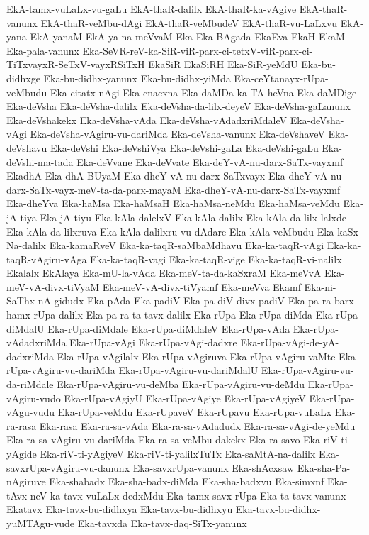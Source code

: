 {EkA-tamx-vuLaLx-vu-gaLu
EkA-thaR-dalilx
EkA-thaR-ka-vAgive
EkA-thaR-vanunx
EkA-thaR-veMbu-dAgi
EkA-thaR-veMbudeV
EkA-thaR-vu-LaLxvu
EkA-yana
EkA-yanaM
EkA-ya-na-meVvaM
Eka
Eka-BAgada
EkaEva
EkaH
EkaM
Eka-pala-vanunx
Eka-SeVR-reV-ka-SiR-viR-parx-ci-tetxV-viR-parx-ci-TiTxvayxR-SeTxV-vayxRSiTxH
EkaSiR
EkaSiRH
Eka-SiR-yeMdU
Eka-bu-didhxge
Eka-bu-didhx-yanunx
Eka-bu-didhx-yiMda
Eka-ceYtanayx-rUpa-veMbudu
Eka-citatx-nAgi
Eka-cnacxna
Eka-daMDa-ka-TA-heVna
Eka-daMDige
Eka-deVsha
Eka-deVsha-dalilx
Eka-deVsha-da-lilx-deyeV
Eka-deVsha-gaLanunx
Eka-deVshakekx
Eka-deVsha-vAda
Eka-deVsha-vAdadxriMdaleV
Eka-deVsha-vAgi
Eka-deVsha-vAgiru-vu-dariMda
Eka-deVsha-vanunx
Eka-deVshaveV
Eka-deVshavu
Eka-deVshi
Eka-deVshiVya
Eka-deVshi-gaLa
Eka-deVshi-gaLu
Eka-deVshi-ma-tada
Eka-deVvane
Eka-deVvate
Eka-deY-vA-nu-darx-SaTx-vayxmf
EkadhA
Eka-dhA-BUyaM
Eka-dheY-vA-nu-darx-SaTxvayx
Eka-dheY-vA-nu-darx-SaTx-vayx-meV-ta-da-parx-mayaM
Eka-dheY-vA-nu-darx-SaTx-vayxmf
Eka-dheYva
Eka-haMsa
Eka-haMsaH
Eka-haMsa-neMdu
Eka-haMsa-veMdu
Eka-jA-tiya
Eka-jA-tiyu
Eka-kAla-dalelxV
Eka-kAla-dalilx
Eka-kAla-da-lilx-lalxde
Eka-kAla-da-lilxruva
Eka-kAla-dalilxru-vu-dAdare
Eka-kAla-veMbudu
Eka-kaSx-Na-dalilx
Eka-kamaRveV
Eka-ka-taqR-saMbaMdhavu
Eka-ka-taqR-vAgi
Eka-ka-taqR-vAgiru-vAga
Eka-ka-taqR-vagi
Eka-ka-taqR-vige
Eka-ka-taqR-vi-nalilx
Ekalalx
EkAlaya
Eka-mU-la-vAda
Eka-meV-ta-da-kaSxraM
Eka-meVvA
Eka-meV-vA-divx-tiVyaM
Eka-meV-vA-divx-tiVyamf
Eka-meVva
Ekamf
Eka-ni-SaThx-nA-gidudx
Eka-pAda
Eka-padiV
Eka-pa-diV-divx-padiV
Eka-pa-ra-barx-hamx-rUpa-dalilx
Eka-pa-ra-ta-tavx-dalilx
Eka-rUpa
Eka-rUpa-diMda
Eka-rUpa-diMdalU
Eka-rUpa-diMdale
Eka-rUpa-diMdaleV
Eka-rUpa-vAda
Eka-rUpa-vAdadxriMda
Eka-rUpa-vAgi
Eka-rUpa-vAgi-dadxre
Eka-rUpa-vAgi-de-yA-dadxriMda
Eka-rUpa-vAgilalx
Eka-rUpa-vAgiruva
Eka-rUpa-vAgiru-vaMte
Eka-rUpa-vAgiru-vu-dariMda
Eka-rUpa-vAgiru-vu-dariMdalU
Eka-rUpa-vAgiru-vu-da-riMdale
Eka-rUpa-vAgiru-vu-deMba
Eka-rUpa-vAgiru-vu-deMdu
Eka-rUpa-vAgiru-vudo
Eka-rUpa-vAgiyU
Eka-rUpa-vAgiye
Eka-rUpa-vAgiyeV
Eka-rUpa-vAgu-vudu
Eka-rUpa-veMdu
Eka-rUpaveV
Eka-rUpavu
Eka-rUpa-vuLaLx
Eka-ra-rasa
Eka-rasa
Eka-ra-sa-vAda
Eka-ra-sa-vAdadudx
Eka-ra-sa-vAgi-de-yeMdu
Eka-ra-sa-vAgiru-vu-dariMda
Eka-ra-sa-veMbu-dakekx
Eka-ra-savo
Eka-riV-ti-yAgide
Eka-riV-ti-yAgiyeV
Eka-riV-ti-yalilxTuTx
Eka-saMtA-na-dalilx
Eka-savxrUpa-vAgiru-vu-danunx
Eka-savxrUpa-vanunx
Eka-shAcxsaw
Eka-sha-Pa-nAgiruve
Eka-shabadx
Eka-sha-badx-diMda
Eka-sha-badxvu
Eka-simxnf
Eka-tAvx-neV-ka-tavx-vuLaLx-dedxMdu
Eka-tamx-savx-rUpa
Eka-ta-tavx-vanunx
Ekatavx
Eka-tavx-bu-didhxya
Eka-tavx-bu-didhxyu
Eka-tavx-bu-didhx-yuMTAgu-vude
Eka-tavxda
Eka-tavx-daq-SiTx-yanunx
}
